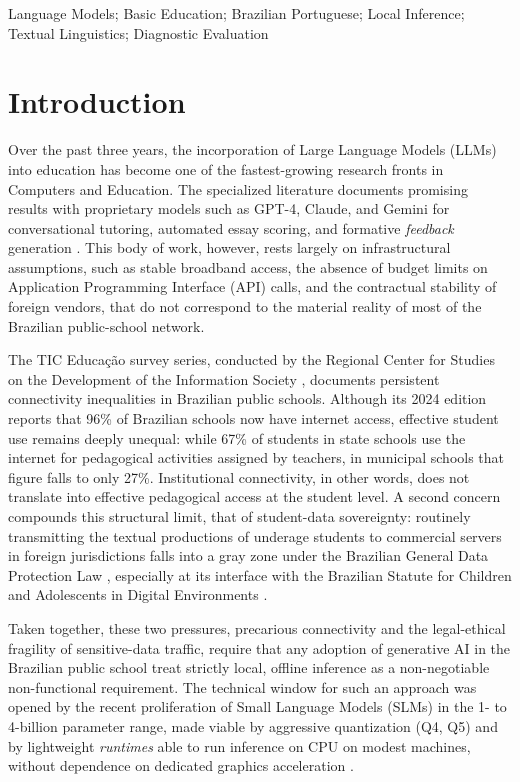 \documentclass{sbc2023}%
\begin{document}
\begin{frontmatter}
\begin{keywords}
Language Models; Basic Education; Brazilian Portuguese; Local Inference; Textual Linguistics; Diagnostic Evaluation
\end{keywords}

\end{frontmatter}


\section{Introduction}
\label{sec:intro}

Over the past three years, the incorporation of Large Language Models (LLMs) into education has become one of the fastest-growing research fronts in Computers and Education. The specialized literature documents promising results with proprietary models such as GPT-4, Claude, and Gemini for conversational tutoring, automated essay scoring, and formative \textit{feedback} generation \citep{kasneci2023chatgpt,tlili2023devil}. This body of work, however, rests largely on infrastructural assumptions, such as stable broadband access, the absence of budget limits on Application Programming Interface (API) calls, and the contractual stability of foreign vendors, that do not correspond to the material reality of most of the Brazilian public-school network.

The TIC Educação survey series, conducted by the Regional Center for Studies on the Development of the Information Society \citep{cgibr2025tic}, documents persistent connectivity inequalities in Brazilian public schools. Although its 2024 edition reports that 96\% of Brazilian schools now have internet access, effective student use remains deeply unequal: while 67\% of students in state schools use the internet for pedagogical activities assigned by teachers, in municipal schools that figure falls to only 27\%. Institutional connectivity, in other words, does not translate into effective pedagogical access at the student level. A second concern compounds this structural limit, that of student-data sovereignty: routinely transmitting the textual productions of underage students to commercial servers in foreign jurisdictions falls into a gray zone under the Brazilian General Data Protection Law \citep{brasil2018lgpd}, especially at its interface with the Brazilian Statute for Children and Adolescents in Digital Environments \citep{brasil2025eca}.

Taken together, these two pressures, precarious connectivity and the legal-ethical fragility of sensitive-data traffic, require that any adoption of generative AI in the Brazilian public school treat strictly local, offline inference as a non-negotiable non-functional requirement. The technical window for such an approach was opened by the recent proliferation of Small Language Models (SLMs) in the 1- to 4-billion parameter range, made viable by aggressive quantization (Q4, Q5) and by lightweight \textit{runtimes} able to run inference on CPU on modest machines, without dependence on dedicated graphics acceleration \citep{abdin2024phi3,yang2024qwen25}.
\end{document}

